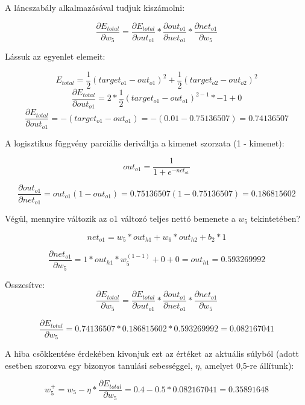 A láncszabály alkalmazásával tudjuk kiszámolni:

\[\frac{\partial E_{total}}{\partial w_{5}} = \frac{\partial E_{total}}{\partial out_{o1}} * \frac{\partial out_{o1}}{\partial net_{o1}} * \frac{\partial net_{o1}}{\partial w_{5}}\]

Lássuk az egyenlet elemeit:
\begin{flushleft}
\begin{equation}
E_{total} = \frac{1}{2}(target_{o1} - out_{o1})^{2} + \frac{1}{2}(target_{o2} - out_{o2})^{2}
\end{equation}
\begin{equation}
\frac{\partial E_{total}}{\partial out_{o1}} = 2 * \frac{1}{2}(target_{o1} - out_{o1})^{2 - 1} * -1 + 0
\end{equation}
\begin{equation}
\frac{\partial E_{total}}{\partial out_{o1}} = -(target_{o1} - out_{o1}) = -(0.01 - 0.75136507) = 0.74136507
\end{equation}

\end{flushleft}

A logisztikus függvény parciális deriváltja a kimenet szorzata (1 - kimenet):

\[out_{o1} = \frac{1}{1+e^{-net_{o1}}}\]

\[\frac{\partial out_{o1}}{\partial net_{o1}} = out_{o1}(1 - out_{o1}) = 0.75136507(1 - 0.75136507) = 0.186815602\]

Végül, mennyire változik az o1 változó teljes nettó bemenete a \(w_5\) tekintetében?

\[net_{o1} = w_5 * out_{h1} + w_6 * out_{h2} + b_2 * 1\]

\[\frac{\partial net_{o1}}{\partial w_{5}} = 1 * out_{h1} * w_5^{(1 - 1)} + 0 + 0 = out_{h1} = 0.593269992\]

Összesítve:\\

\[\frac{\partial E_{total}}{\partial w_{5}} = \frac{\partial E_{total}}{\partial out_{o1}} * \frac{\partial out_{o1}}{\partial net_{o1}} * \frac{\partial net_{o1}}{\partial w_{5}}\]

\[\frac{\partial E_{total}}{\partial w_{5}} = 0.74136507 * 0.186815602 * 0.593269992 = 0.082167041\]

A hiba csökkentése érdekében kivonjuk ezt az értéket az aktuális súlyból (adott esetben szorozva egy bizonyos tanulási sebességgel, $\eta$, amelyet 0,5-re állítunk):

\[w_5^{+} = w_5 - \eta * \frac{\partial E_{total}}{\partial w_{5}} = 0.4 - 0.5 * 0.082167041 = 0.35891648\]

